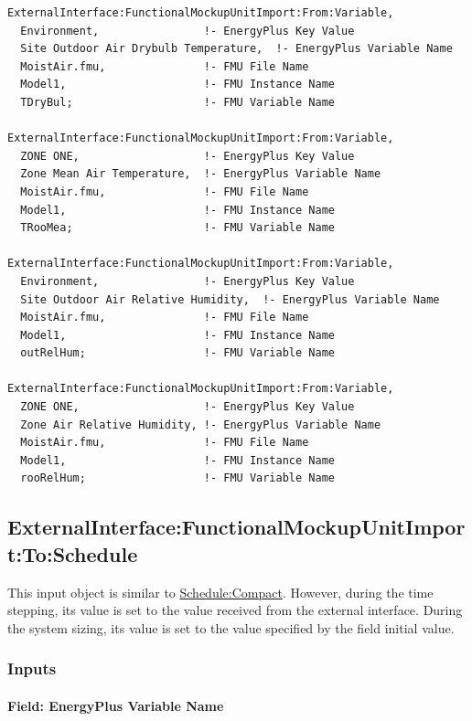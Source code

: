 \begin{lstlisting}
ExternalInterface:FunctionalMockupUnitImport:From:Variable,
  Environment,                !- EnergyPlus Key Value
  Site Outdoor Air Drybulb Temperature,  !- EnergyPlus Variable Name
  MoistAir.fmu,               !- FMU File Name
  Model1,                     !- FMU Instance Name
  TDryBul;                    !- FMU Variable Name

ExternalInterface:FunctionalMockupUnitImport:From:Variable,
  ZONE ONE,                   !- EnergyPlus Key Value
  Zone Mean Air Temperature,  !- EnergyPlus Variable Name
  MoistAir.fmu,               !- FMU File Name
  Model1,                     !- FMU Instance Name
  TRooMea;                    !- FMU Variable Name

ExternalInterface:FunctionalMockupUnitImport:From:Variable,
  Environment,                !- EnergyPlus Key Value
  Site Outdoor Air Relative Humidity,  !- EnergyPlus Variable Name
  MoistAir.fmu,               !- FMU File Name
  Model1,                     !- FMU Instance Name
  outRelHum;                  !- FMU Variable Name

ExternalInterface:FunctionalMockupUnitImport:From:Variable,
  ZONE ONE,                   !- EnergyPlus Key Value
  Zone Air Relative Humidity, !- EnergyPlus Variable Name
  MoistAir.fmu,               !- FMU File Name
  Model1,                     !- FMU Instance Name
  rooRelHum;                  !- FMU Variable Name
\end{lstlisting}

\subsection{ExternalInterface:FunctionalMockupUnitImport:To:Schedule}\label{externalinterfacefunctionalmockupunitimporttoschedule}

This input object is similar to \hyperref[schedulecompact]{Schedule:Compact}. However, during the time stepping, its value is set to the value received from the external interface. During the system sizing, its value is set to the value specified by the field initial value.

\subsubsection{Inputs}\label{inputs-6-009}

\paragraph{Field: EnergyPlus Variable Name}\label{field-energyplus-variable-name-1}


